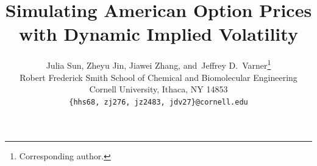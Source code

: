 \documentclass{article}
\title{Simulating American Option Prices with Dynamic Implied Volatility}
\author{
  Julia Sun,\; Zheyu Jin,\; Jiawei Zhang,\; and\, Jeffrey D.\ Varner\thanks{Corresponding author.} \\
  Robert Frederick Smith School of Chemical and Biomolecular Engineering \\
  Cornell University, Ithaca, NY 14853 \\
  {\fontencoding{T1}\selectfont\texttt{\{hhs68, zj276, jz2483, jdv27\}@cornell.edu}}
}
\begin{document}
\raggedbottom

\maketitle

\begin{abstract}

\end{abstract}









\setlength{\bibsep}{3pt}


\clearpage

\appendix
\renewcommand{\thefigure}{S\arabic{figure}}
\renewcommand{\thetable}{S\arabic{table}}
\renewcommand{\thealgorithm}{S\arabic{algorithm}}
\setcounter{figure}{0}
\setcounter{table}{0}
\setcounter{algorithm}{0}





\end{document}

